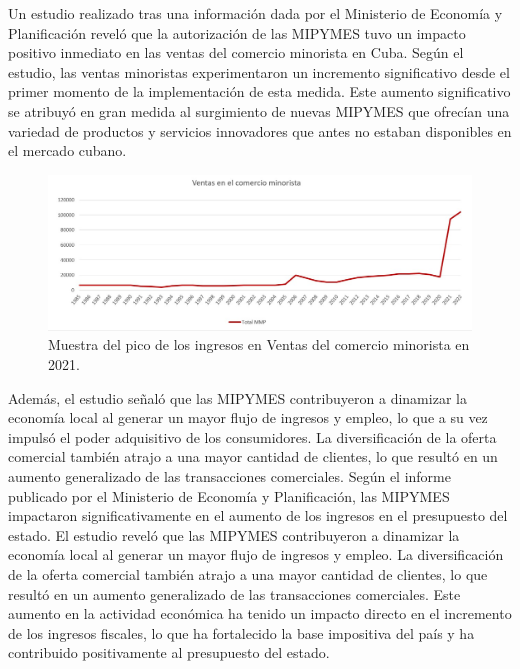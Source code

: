 \documentclass{article}
\begin{document}
Un estudio realizado tras una información dada por el Ministerio de Economía y Planificación reveló que la autorización de las MIPYMES tuvo un impacto positivo inmediato en las ventas del comercio minorista en Cuba. Según el estudio, las ventas minoristas experimentaron un incremento significativo desde el primer momento de la implementación de esta medida. Este aumento significativo se atribuyó en gran medida al surgimiento de nuevas MIPYMES que ofrecían una variedad de productos y servicios innovadores que antes no estaban disponibles en el mercado cubano.



\begin{figure}[h]
	\centering
	\includegraphics[width=\textwidth]{Ventas.jpg}
	\caption{Muestra del pico de los ingresos en Ventas del comercio minorista en 2021.}
	\label{fig:mi_imagen}
\end{figure}

\newpage

Además, el estudio señaló que las MIPYMES contribuyeron a dinamizar la economía local al generar un mayor flujo de ingresos y empleo, lo que a su vez impulsó el poder adquisitivo de los consumidores. La diversificación de la oferta comercial también atrajo a una mayor cantidad de clientes, lo que resultó en un aumento generalizado de las transacciones comerciales.
Según el informe publicado por el Ministerio de Economía y Planificación, las MIPYMES impactaron significativamente en el aumento de los ingresos en el presupuesto del estado. El estudio reveló que las MIPYMES contribuyeron a dinamizar la economía local al generar un mayor flujo de ingresos y empleo. La diversificación de la oferta comercial también atrajo a una mayor cantidad de clientes, lo que resultó en un aumento generalizado de las transacciones comerciales. Este aumento en la actividad económica ha tenido un impacto directo en el incremento de los ingresos fiscales, lo que ha fortalecido la base impositiva del país y ha contribuido positivamente al presupuesto del estado.
\end{document}
